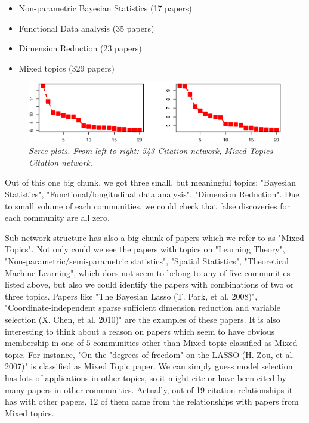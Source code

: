 \documentclass[AMS,STIX1COL]{WileyNJD-v2}
\begin{document}
\begin{itemize}
  \item Non-parametric Bayesian Statistics (17 papers)
  \item Functional Data analysis (35 papers)
  \item Dimension Reduction (23 papers)
  \item Mixed topics (329 papers)
\end{itemize}

\begin{figure}[htbp]
\includegraphics[width=1\textwidth]{Fig4.eps}
\caption{\it Scree plots. From left to right: 543-Citation network, Mixed Topics-Citation network.}
\label{fig:figure4}
\end{figure}

Out of this one big chunk, we got three small, but meaningful topics: "Bayesian Statistics", "Functional/longitudinal data analysis", "Dimension Reduction".
Due to small volume of each communities, we could check that false discoveries for each community are all zero.

Sub-network structure has also a big chunk of papers which we refer to as "Mixed Topics".
Not only could we see the papers with topics on "Learning Theory", "Non-parametric/semi-parametric statistics", "Spatial Statistics", "Theoretical Machine Learning", which does not seem to belong to any of five communities listed above, but also we could identify the papers with combinations of two or three topics.
Papers like "The Bayesian Lasso (T. Park, et al. 2008)", "Coordinate-independent sparse sufficient dimension reduction and variable selection (X. Chen, et al. 2010)" are the examples of these papers.
It is also interesting to think about a reason on papers which seem to have obvious membership in one of $5$ communities other than Mixed topic classified as Mixed topic.
For instance, "On the "degrees of freedom" on the LASSO (H. Zou, et al. 2007)" is classified as Mixed Topic paper.
We can simply guess model selection has lots of applications in other topics, so it might cite or have been cited by many papers in other communities.
Actually, out of 19 citation relationships it has with other papers, 12 of them came from the relationships with papers from Mixed topics. 
\end{document}
